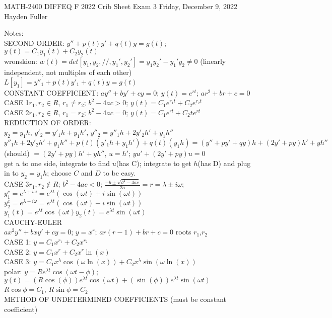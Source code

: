 \documentclass{article}
\begin{document}
MATH-2400 DIFFEQ F 2022 Crib Sheet Exam 3 Friday, December 9, 2022 Hayden Fuller
\begin{large}
\noindent Notes:
\\SECOND ORDER: $y''+p(t)y'+q(t)y=g(t)$; $y(t)=C_1y_1(t)+C_2y_2(t)$
\\wronskion: $w(t)=det[y_1,y_2,//,y_1',y_2']=y_1y_2'-y_1'y_2\ne0$ (linearly independent, not multiples of each other)
\\$L[y_1]=y''_1+p(t)y'_1+q(t)y=g(t)$
\\CONSTANT COEFFICIENT: $ay''+by'+cy=0$; $y(t)=e^{rt}$; $ar^2+br+c=0$
\\CASE 1$r_1,r_2\in R$, $r_1\ne r_2$; $b^2-4ac>0$; $y(t)=C_1e^{r_1t}+C_2e^{r_2t}$
\\CASE 2$r_1,r_2\in R$, $r_1=r_2$; $b^2-4ac=0$; $y(t)=C_1e^{rt}+C_2te^{rt}$
\\REDUCTION OF ORDER:
\\$y_2=y_1h$, $y'_2=y'_1h+y_1h'$, $y''_2=y''_1h+2y'_2h'+y_1h''$
\\$y''_1h+2y'_2h'+y_1h''+p(t)(y'_1h+y_1h')+q(t)(y_1h)=(y''+py'+qy)h+(2y'+py)h'+yh''$ (should) $=(2y'+py)h'+yh''$, $u=h'$; $yu'+(2y'+py)u=0$
\\get $u$ to one side, integrate to find $u$(has C); integrate to get $h$(has D) and plug in to $y_2=y_1h$; choose $C$ and $D$ to be easy.
\\CASE 3$r_1,r_2\not\in R$; $b^2-4ac<0$; $\frac{-b\pm\sqrt{b^2-4ac}}{2a}=r=\lambda\pm i\omega$; 
\\$y_1^c=e^{\lambda+i\omega}=e^{\lambda t}(\cos(\omega t)+i\sin(\omega  t))$
\\$y_2^c=e^{\lambda-i\omega}=e^{\lambda t}(\cos(\omega t)-i\sin(\omega  t))$
\\$y_1(t)=e^{\lambda t}\cos(\omega t)$\qquad$y_2(t)=e^{\lambda t}\sin(\omega t)$
\\CAUCHY-EULER
\\$ax^2y''+bxy'+cy=0$; $y=x^r$; $ar(r-1)+br+c=0$ roots $r_1$,$r_2$
\\CASE 1: $y=C_1x^{r_1}+C_2x^{r_2}$
\\CASE 2: $y=C_1x^r+C_2x^r\ln(x)$
\\CASE 3: $y=C_1x^{\lambda}\cos(\omega\ln(x))+C_2x^{\lambda}\sin(\omega\ln(x))$
\\polar: $y=Re^{\lambda t}\cos(\omega t-\phi)$; $y(t)=(R\cos(\phi))e^{\lambda t}\cos(\omega t)+(\sin(\phi))e^{\lambda t}\sin(\omega t)$
\\$R\cos\phi=C_1$, $R\sin\phi=C_2$
\\METHOD OF UNDETERMINED COEFFICIENTS (must be constant coefficient)

\end{large}
\end{document}
